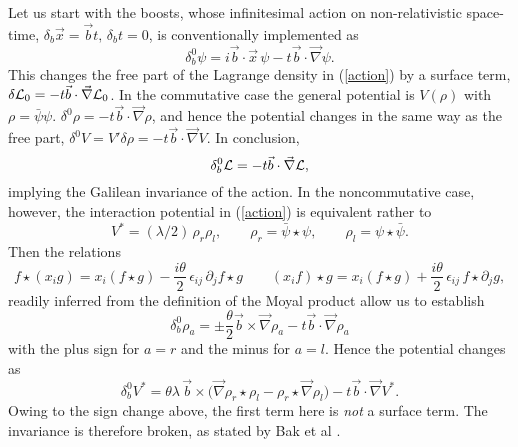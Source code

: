 \documentclass[a4paper,11pt]{article}
\def\p{{\partial}}
\def\vb{{\vec b}}
\def\vx{{\vec x}}
\def\vnabla{{\vec\nabla}}
\begin{document}
Let us start with the boosts, whose infinitesimal action on
non-relativistic space-time, $\delta_{b}\vx=\vb t,\,\delta_{b}t=0$,
is conventionally implemented as
\begin{equation}
     \delta^{0}_{b}\psi=i\vb\cdot\vx\,\psi-t\vb\cdot\vnabla\psi.
     \label{convbimp}
\end{equation}
This changes the free part of the Lagrange density in
(\ref{action}) by a surface term,
$\delta{\cal L}_{0}=-t\vb\cdot\vnabla{\cal L}_{0}$.
In the commutative case the general
potential is $V(\rho)$ with $\rho=\bar{\psi}\psi$.
  $\delta^{0}\rho=-t\vb\cdot\vnabla\rho$,
and hence the potential
changes in the same way as the free part,
$
\delta^0V=V'\delta\rho=
-t\vb\cdot\vnabla V.
$
In conclusion,
\begin{equation}
     \delta^0_{b}{\cal L}=-t\vb\cdot\vnabla{\cal L},
     \label{convLagchange}
\end{equation}
implying the Galilean invariance of the action.
In the noncommutative case, however,
the interaction potential in (\ref{action})
is equivalent rather to
\begin{equation}
V^*=(\lambda/2)\,\rho_{r}\rho_{l},
\qquad
\rho_{r}=\bar{\psi}\star\psi,
\qquad
\rho_{l}=\psi\star\bar{\psi}.
\label{ncpot}
\end{equation}
Then the relations
\begin{equation}
     f\star(x_{i}g)
     =
     x_{i}(f\star g)-\frac{i\theta}{2}\,\epsilon_{ij}\,\p_{j}f\star g
     \qquad
     (x_{i}f)\star g
     =
     x_{i}(f\star g)+\frac{i\theta}{2}\,\epsilon_{ij}\,f\star \p_{j}g,
     \label{xrel}
\end{equation}
readily inferred from the definition of the Moyal product allow us
to establish
\begin{equation}
\delta^{0}_{b}\rho_{a}=\pm
\frac{\theta}{2}\vb\times\vnabla\rho_{a}
-t\vb\cdot\vnabla\rho_{a}
\label{ordlrdenschange}
\end{equation}
with the plus sign for $a=r$ and the minus for $a=l$.
Hence the potential changes as
\begin{equation}
     \delta^0_{b}V^*=
     {\theta}\lambda\,\vb\times\Big(
     \vnabla\rho_{r}\star\rho_{l}
     -\rho_{r}\star\vnabla\rho_{l}
     \Big)-t\vb\cdot\vnabla V^*.
     \label{Vstarchange}
\end{equation}
Owing to the sign change above, the first term here is {\it not}
a surface term. The invariance is therefore broken,
as stated  by Bak et al \cite{Baketal}.
\goodbreak
\end{document}
